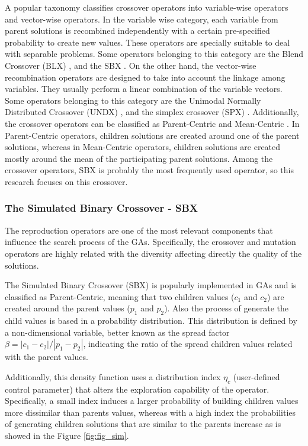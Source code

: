 A popular taxonomy classifies crossover operators into variable-wise operators and vector-wise operators.
%
In the variable wise category, each variable from parent solutions is recombined independently with a certain pre-specified probability to create new values.
%
These operators are specially suitable to deal with separable problems.
%
Some operators belonging to this category are the Blend Crossover (BLX) \cite{eshelman1993real}, and the SBX \cite{Joel:SBX1994}.
%
On the other hand, the vector-wise recombination operators are designed to take into account the linkage among variables.
%
They usually perform a linear combination of the variable vectors.
%
Some operators belonging to this category are the Unimodal Normally Distributed Crossover (UNDX) \cite{Joel:UNDX}, and the simplex crossover (SPX) \cite{Joel:DE_Storn_SPX}.
%
Additionally, the crossover operators can be classified as Parent-Centric and Mean-Centric \cite{jain2011parent}.
%
In Parent-Centric operators, children solutions are created around one of the parent solutions, whereas in Mean-Centric operators, children solutions are created mostly around the mean of the participating parent solutions.
%
Among the crossover operators, SBX is probably the most frequently used operator, so this research focuses on this crossover.

\subsubsection{The Simulated Binary Crossover - SBX}

The reproduction operators are one of the most relevant components that influence the search process of the GAs.
%
Specifically, the crossover and mutation operators are highly related with the diversity affecting directly the quality of the solutions.
%

The Simulated Binary Crossover (SBX) \cite{deb1994simulated} is popularly implemented in GAs \cite{Joel:NSGAII,Joel:SMSEMOA} and is classified as Parent-Centric, meaning that two children values ($c_1$ and $c_2$) are created around the parent values ($p_1$ and $p_2$).
%
Also the process of generate the child values is based in a probability distribution.
%
This distribution is defined by a non-dimensional variable, better known as the spread factor $\beta = |c_1 - c_2 | / |p_1 - p_2|$, indicating the ratio of the spread children values related with the parent values.
%

Additionally, this density function uses a distribution index $\eta_c$ (user-defined control parameter) that alters the exploration capability of the operator.
%
Specifically, a small index induces a larger probability of building children values more dissimilar than parents values, whereas with a high index the probabilities of generating children solutions that are similar to the parents increase as is showed in the Figure \ref{fig:fig_sim}.
%

